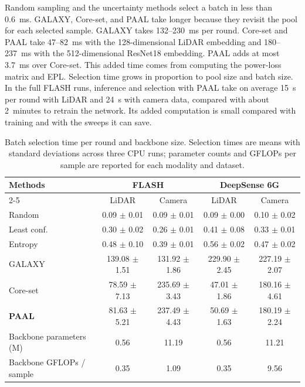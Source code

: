 \documentclass[journal,onecolumn]{IEEEtran}
\begin{document}
Random sampling and the uncertainty methods select a batch in less than 0.6~ms. GALAXY, Core-set, and PAAL take longer because they revisit the pool for each selected sample. GALAXY takes 132--230~ms per round. Core-set and PAAL take 47--82~ms with the 128-dimensional LiDAR embedding and 180--237~ms with the 512-dimensional ResNet18 embedding. PAAL adds at most 3.7~ms over Core-set. This added time comes from computing the power-loss matrix and EPL. Selection time grows in proportion to pool size and batch size. In the full FLASH runs, inference and selection with PAAL take on average 15~s per round with LiDAR and 24~s with camera data, compared with about 2~minutes to retrain the network. Its added computation is small compared with training and with the sweeps it can save.

\begin{table}[!t]
  \renewcommand{\arraystretch}{1.2}
  \caption{Batch selection time per round and backbone size. Selection times are means with standard deviations across three CPU runs; parameter counts and GFLOPs per sample are reported for each modality and dataset.}
  \label{tab:cost}
  \centering
  \footnotesize
  \begin{tabular}{|l|c|c||c|c|}
    \hline
    \multirow{2}{*}{\textbf{Methods}} & \multicolumn{2}{c||}{\textbf{FLASH}} & \multicolumn{2}{c|}{\textbf{DeepSense 6G}} \\
    \cline{2-5}
    & LiDAR & Camera & LiDAR & Camera \\
    \hline
    Random      & 0.09 $\pm$ 0.01 & 0.09 $\pm$ 0.01 & 0.09 $\pm$ 0.00 & 0.10 $\pm$ 0.02 \\
    Least conf. & 0.30 $\pm$ 0.02 & 0.26 $\pm$ 0.01 & 0.41 $\pm$ 0.08 & 0.33 $\pm$ 0.01 \\
    Entropy     & 0.48 $\pm$ 0.10 & 0.39 $\pm$ 0.01 & 0.56 $\pm$ 0.02 & 0.47 $\pm$ 0.02 \\
    GALAXY      & 139.08 $\pm$ 1.51 & 131.92 $\pm$ 1.86 & 229.90 $\pm$ 2.45 & 227.19 $\pm$ 2.07 \\
    Core-set    & 78.59 $\pm$ 7.13 & 235.69 $\pm$ 3.43 & 47.01 $\pm$ 1.86 & 180.16 $\pm$ 4.61 \\
    \textbf{PAAL} & 81.63 $\pm$ 5.21 & 237.49 $\pm$ 4.43 & 50.69 $\pm$ 1.63 & 180.19 $\pm$ 2.24 \\
    \hline
    Backbone parameters (M)  & 0.56 & 11.19 & 0.56 & 11.21 \\
    Backbone GFLOPs / sample & 0.35 & 1.09 & 0.35 & 9.56 \\
    \hline
  \end{tabular}
\end{table}
\end{document}
